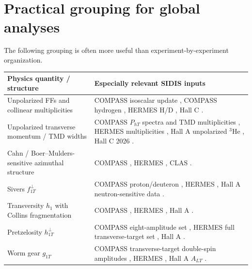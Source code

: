 \documentclass[11pt]{article}
\newcommand{\pt}{P_{hT}}
\begin{document}
\section{Practical grouping for global analyses}

The following grouping is often more useful than experiment-by-experiment organization.

\begin{center}
\small
\begin{tabular}{@{}p{}p{}@{}}
\toprule
Physics quantity / structure & Especially relevant SIDIS inputs \\ \midrule
Unpolarized FFs and collinear multiplicities &
COMPASS isoscalar update \cite{COMPASS:addendum2026}, COMPASS hydrogen
\cite{COMPASS:Hmult2025}, HERMES H/D \cite{HERMES:multiplicity2013}, Hall C
\cite{JLABC:E00108,JLABC:mult2026}. \\

Unpolarized transverse momentum / TMD widths &
COMPASS $\pt$ spectra and TMD multiplicities \cite{COMPASS:pt2013,COMPASS:tmdmult2018},
HERMES multiplicities \cite{HERMES:multiplicity2013}, Hall A unpolarized $^3$He
\cite{JLABA:unpol2017}, Hall C 2026 \cite{JLABC:mult2026}. \\

Cahn / Boer--Mulders-sensitive azimuthal structure &
COMPASS \cite{COMPASS:azimuth2014}, HERMES \cite{HERMES:azimuth2013},
CLAS \cite{CLAS:unpol2009}. \\

Sivers $f_{1T}^{\perp}$ &
COMPASS proton/deuteron \cite{COMPASS:Sivers2012,COMPASS:eightTSA2017,
COMPASS:weightedSivers2019,COMPASS:CSdeut2024},
HERMES \cite{HERMES:Sivers2009,HERMES:fullTSA2020},
Hall A neutron-sensitive data \cite{JLABA:CS2011}. \\

Transversity $h_1$ with Collins fragmentation &
COMPASS \cite{COMPASS:Collins2012,COMPASS:identifiedP2015,COMPASS:CSdeut2024},
HERMES \cite{HERMES:Collins2010,HERMES:fullTSA2020},
Hall A \cite{JLABA:CS2011}. \\

Pretzelosity $h_{1T}^{\perp}$ &
COMPASS eight-amplitude set \cite{COMPASS:eightTSA2017}, HERMES full transverse-target set
\cite{HERMES:fullTSA2020}, Hall A \cite{JLABA:pretzel2014}. \\

Worm gear $g_{1T}$ &
COMPASS transverse-target double-spin amplitudes \cite{COMPASS:eightTSA2017},
HERMES \cite{HERMES:fullTSA2020}, Hall A $A_{LT}$ \cite{JLABA:ALT2012}. \\


\end{tabular}
\end{center}
\end{document}
